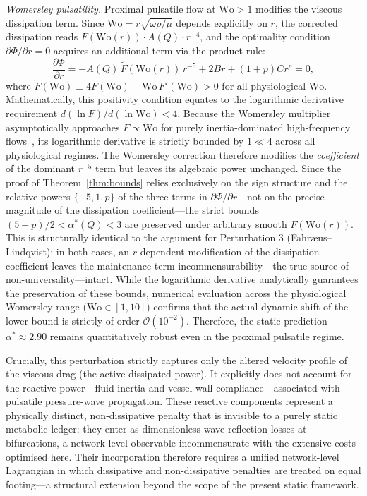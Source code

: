 \documentclass[11pt,a4paper]{article}
\theoremstyle{remark}
\begin{document}
\textit{Womersley pulsatility.} Proximal pulsatile flow at $\mathrm{Wo} > 1$
modifies the viscous dissipation term. Since $\mathrm{Wo} =
r\sqrt{\omega\rho/\mu}$
depends explicitly on $r$, the corrected dissipation reads
$F(\mathrm{Wo}(r))\cdot A(Q)\cdot r^{-4}$, and the optimality condition
$\partial\Phi/\partial r=0$
acquires an additional term via the product rule:
\[
\frac{\partial\Phi}{\partial r} = -A(Q)\,\tilde{F}(\mathrm{Wo}(r))\,r^{-5} + 2Br + (1+p)Cr^p = 0,
\]
where $\tilde{F}(\mathrm{Wo}) \equiv 4F(\mathrm{Wo}) -
\mathrm{Wo}\,F'(\mathrm{Wo}) > 0$ for all physiological $\mathrm{Wo}$.
Mathematically, this positivity condition equates to the logarithmic derivative
requirement $d(\ln F)/d(\ln \mathrm{Wo}) < 4$. Because the Womersley multiplier
asymptotically approaches $F \propto \mathrm{Wo}$ for purely inertia-dominated
high-frequency flows~\cite{Westerhof2010}, its logarithmic derivative is strictly
bounded by $1 \ll 4$ across all physiological regimes. The Womersley correction
therefore modifies the \textit{coefficient} of the dominant $r^{-5}$
term but leaves its algebraic power unchanged. Since the proof of
Theorem~\ref{thm:bounds} relies exclusively on the sign structure and the
relative powers $\{-5, 1, p\}$
of the three terms in $\partial\Phi/\partial r$---not on the precise magnitude
of the dissipation coefficient---the strict bounds $(5+p)/2 < \alpha^*(Q) < 3$
are preserved under arbitrary smooth $F(\mathrm{Wo}(r))$. This is structurally
identical to the argument for Perturbation 3 (Fahr\ae us--Lindqvist): in both
cases, an $r$-dependent modification of the dissipation coefficient leaves the
maintenance-term incommensurability---the true source of
non-universality---intact. While the logarithmic derivative analytically
guarantees the preservation of these bounds, numerical evaluation across the
physiological Womersley range ($\mathrm{Wo} \in [1, 10]$) confirms that the
actual dynamic shift of the lower bound is strictly of order
$\mathcal{O}(10^{-2})$. Therefore, the static prediction $\alpha^* \approx 2.90$
remains quantitatively robust even in the proximal pulsatile regime.

Crucially, this perturbation strictly captures only the altered velocity
profile of the viscous drag (the active dissipated power). It explicitly
does not account for the reactive power---fluid inertia and vessel-wall
compliance---associated with pulsatile pressure-wave propagation. These
reactive components represent a physically distinct, non-dissipative
penalty that is invisible to a purely static metabolic ledger: they enter
as dimensionless wave-reflection losses at bifurcations, a network-level
observable incommensurate with the extensive costs optimised here. Their
incorporation therefore requires a unified network-level Lagrangian in
which dissipative and non-dissipative penalties are treated on equal
footing---a structural extension beyond the scope of the present static
framework.
\end{document}
